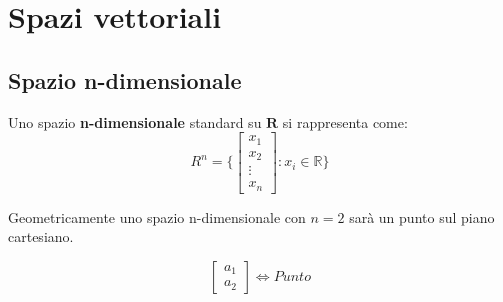 \newpage
\section{Spazi vettoriali}
\subsection{Spazio n-dimensionale}
\begin{definition}
	Uno spazio \textbf{n-dimensionale} standard su $\mathbf{R}$ si rappresenta come:
	\begin{equation*}	
		R^n = \Bigg\{ \begin{bmatrix}x_1\\x_2\\ \vdots \\ x_n\end{bmatrix} : x_i \in \mathbb{R} \Bigg\}
	\end{equation*}
\end{definition}
\noindent Geometricamente uno spazio n-dimensionale con $n=2$ sarà un punto sul piano cartesiano.\\
\begin{minipage}{.3\linewidth}
	\centering
	\[
	\begin{bmatrix}a_1\\a_2\end{bmatrix} \Longleftrightarrow Punto
	\] 
\end{minipage}
